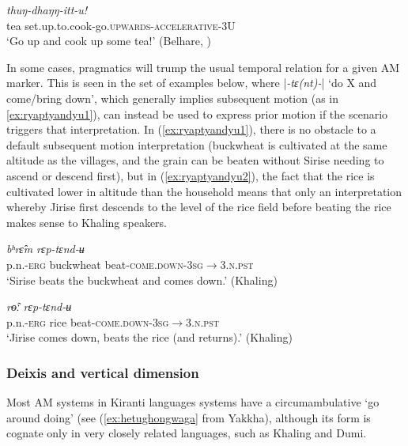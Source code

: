 \documentclass[oneside,a4paper,11pt]{article}
\newcommand{\ipa}[1]{{\phon\textit{#1}}}
\newcommand{\sens}[1]{‘#1’}
\newcommand{\rouge}[1]{{\color{red}#1}}
\newcommand{\dhatu}[2]{|\ipa{#1}| `#2'}
\begin{document}
 \begin{exe}
\ex \label{ex:thuNdhaNNittu}
 \gll   \ipa{cia}	\ipa{thuŋ-\rouge{dhaŋŋ}-itt-u!} \\
 tea set.up.to.cook-\rouge{go.\textsc{upwards}}-\textsc{accelerative}-3U \\
\glt \sens{Go up and cook up some tea!} (Belhare, \citealt[73]{bickel99spatial})
 \end{exe}

In some cases, pragmatics will trump the usual temporal relation for a given AM marker.  This is seen in the set of examples below, where  \dhatu{-tɛ(nt)-}{do X and come/bring down}, which  generally implies subsequent motion (as in \ref{ex:ryaptyandyu1}), can instead be used to express prior motion if the scenario triggers that interpretation.  In (\ref{ex:ryaptyandyu1}), there is no obstacle to a default subsequent motion interpretation (buckwheat is cultivated at the same altitude as the villages, and the grain can be beaten without Sirise needing to ascend or descend first), but in (\ref{ex:ryaptyandyu2}), the fact that the rice is cultivated lower in altitude than the household means that only an interpretation whereby Jirise first descends to the level of the rice field before beating the rice makes sense to Khaling speakers. 

 \begin{exe}
\ex \label{ex:ryaptyandyu1}
  \gll   \ipa{siriseʔ-ɛ} \ipa{bʰrɛ̂m}  \ipa{rɛp-\rouge{tɛnd}-ʉ} \\
   p.n.-\textsc{erg} buckwheat beat-\textsc{\rouge{come.down}}-\textsc{3sg$\rightarrow$3.n.pst} \\
\glt `Sirise beats the buckwheat and comes down.'  (Khaling)
 \end{exe}
 
 
 \begin{exe}
\ex \label{ex:ryaptyandyu2}
 \gll   \ipa{dzirise-ʔɛ} \ipa{rɵ̂ː} \ipa{rɛp-\rouge{tɛnd}-ʉ} \\
 p.n.-\textsc{erg} rice beat-\textsc{\rouge{come.down}}-\textsc{3sg$\rightarrow$3.n.pst} \\
\glt `Jirise comes down, beats the rice (and returns).'  (Khaling)
 \end{exe}



 \subsubsection{Deixis and vertical dimension} \label{sec:vertical.khaling}
  Most AM systems in Kiranti languages systems have a circumambulative `go around doing' (see (\ref{ex:hetughongwaga} from Yakkha), although its form is cognate only in very closely related languages, such as Khaling and Dumi.   
  
\end{document}
